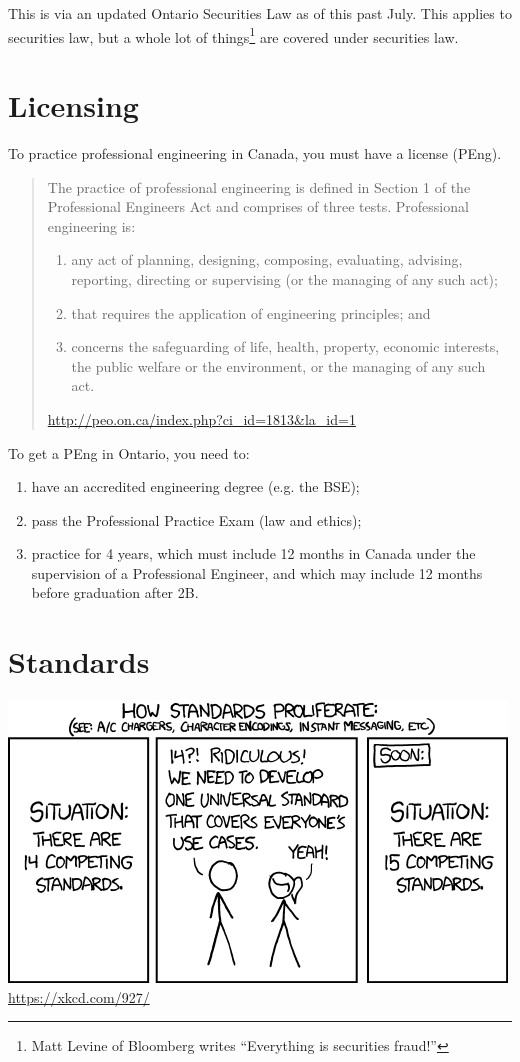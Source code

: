 \documentclass[11pt]{article}
\begin{document}
This is via an updated Ontario Securities Law as of this past July. This applies to securities law, but a whole lot of things\footnote{Matt Levine of Bloomberg writes ``Everything is securities fraud!''} are covered under securities law. 
\newpage
\section*{Licensing}
To practice professional engineering in Canada, you must have a license (PEng).

\begin{quote}
The practice of professional engineering is defined in Section 1 of the Professional Engineers Act and comprises of three tests. Professional engineering is:

\begin{enumerate}
\item    any act of planning, designing, composing, evaluating, advising, reporting, directing or supervising (or the managing of any such act);
\item    that requires the application of engineering principles; and
\item    concerns the safeguarding of life, health, property, economic interests, the public welfare or the environment, or the managing of any such act.
\end{enumerate}

\hfill \url{http://peo.on.ca/index.php?ci_id=1813&la_id=1}
\end{quote}

To get a PEng in Ontario, you need to:
\begin{enumerate}
\item have an accredited engineering degree (e.g. the BSE);
\item pass the Professional Practice Exam (law and ethics);
\item practice for 4 years, which must include 12 months in Canada under the supervision of a Professional Engineer, and which may include 12 months before graduation after 2B.
\end{enumerate}

\section*{Standards}

\begin{center}
\includegraphics[width=.7\textwidth]{images/L17-standards.png}\\
\url{https://xkcd.com/927/}
\end{center}
\end{document}
